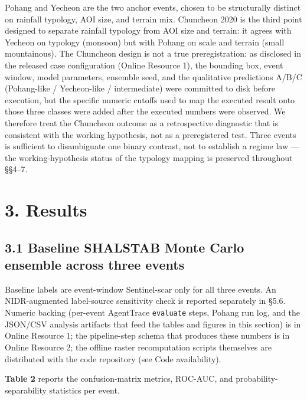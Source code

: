 \documentclass[11pt,a4paper]{article}
\begin{document}
Pohang and Yecheon are the two anchor events, chosen to be structurally distinct on rainfall typology, AOI size, and terrain mix. Chuncheon 2020 is the third point designed to separate rainfall typology from AOI size and terrain: it agrees with Yecheon on typology (monsoon) but with Pohang on scale and terrain (small mountainous). The Chuncheon design is not a true preregistration: as disclosed in the released case configuration (Online Resource 1), the bounding box, event window, model parameters, ensemble seed, and the qualitative predictions A/B/C (Pohang-like / Yecheon-like / intermediate) were committed to disk before execution, but the specific numeric cutoffs used to map the executed result onto those three classes were added after the executed numbers were observed. We therefore treat the Chuncheon outcome as a retrospective diagnostic that is consistent with the working hypothesis, not as a preregistered test. Three events is sufficient to disambiguate one binary contrast, not to establish a regime law --- the working-hypothesis status of the typology mapping is preserved throughout §§4--7.

\section{3. Results}\label{results}

\subsection{3.1 Baseline SHALSTAB Monte Carlo ensemble across three events}\label{baseline-shalstab-monte-carlo-ensemble-across-three-events}

Baseline labels are event-window Sentinel-scar only for all three events. An NIDR-augmented label-source sensitivity check is reported separately in §5.6. Numeric backing (per-event AgentTrace \texttt{evaluate} steps, Pohang run log, and the JSON/CSV analysis artifacts that feed the tables and figures in this section) is in Online Resource 1; the pipeline-step schema that produces these numbers is in Online Resource 2; the offline raster recomputation scripts themselves are distributed with the code repository (see Code availability).

\textbf{Table 2} reports the confusion-matrix metrics, ROC-AUC, and probability-separability statistics per event.
\end{document}
